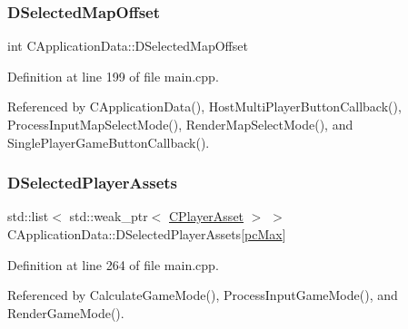 \hypertarget{classCApplicationData_a443edd0c2c7964fc51a82bf2a016725b}{}\label{classCApplicationData_a443edd0c2c7964fc51a82bf2a016725b} 
\subsubsection{\texorpdfstring{D\+Selected\+Map\+Offset}{DSelectedMapOffset}}
{\footnotesize\ttfamily int C\+Application\+Data\+::\+D\+Selected\+Map\+Offset\hspace{0.3cm}{\ttfamily [protected]}}



Definition at line 199 of file main.\+cpp.



Referenced by C\+Application\+Data(), Host\+Multi\+Player\+Button\+Callback(), Process\+Input\+Map\+Select\+Mode(), Render\+Map\+Select\+Mode(), and Single\+Player\+Game\+Button\+Callback().

\hypertarget{classCApplicationData_a05c1087d5a5c4ddc14fcb37444f1642b}{}\label{classCApplicationData_a05c1087d5a5c4ddc14fcb37444f1642b} 
\subsubsection{\texorpdfstring{D\+Selected\+Player\+Assets}{DSelectedPlayerAssets}}
{\footnotesize\ttfamily std\+::list$<$ std\+::weak\+\_\+ptr$<$ \hyperlink{classCPlayerAsset}{C\+Player\+Asset} $>$ $>$ C\+Application\+Data\+::\+D\+Selected\+Player\+Assets\mbox{[}\hyperlink{GameDataTypes_8h_aafb0ca75933357ff28a6d7efbdd7602fa594a5c8dd3987f24e8a0f23f1a72cd34}{pc\+Max}\mbox{]}\hspace{0.3cm}{\ttfamily [protected]}}



Definition at line 264 of file main.\+cpp.



Referenced by Calculate\+Game\+Mode(), Process\+Input\+Game\+Mode(), and Render\+Game\+Mode().

\hypertarget{classCApplicationData_af2959556fc881145d9d777c627a9345d}{}\label{classCApplicationData_af2959556fc881145d9d777c627a9345d} 
